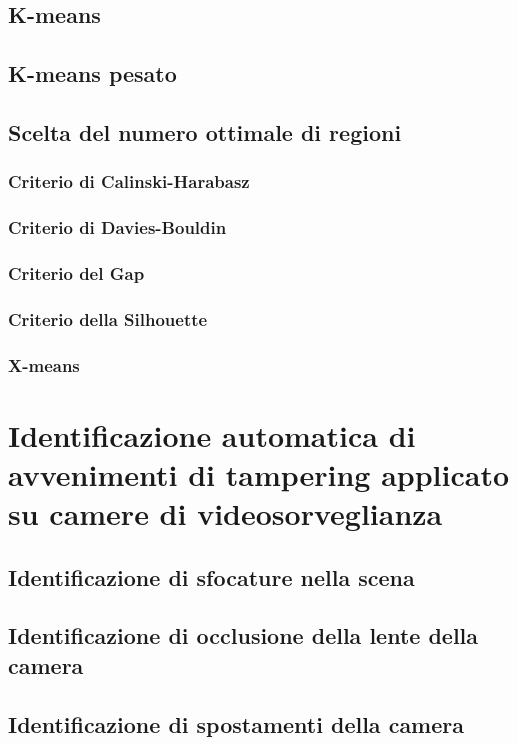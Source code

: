 		\subsection{K-means}
		\subsection{K-means pesato}
		\subsection{Scelta del numero ottimale di regioni}
			\subsubsection{Criterio di Calinski-Harabasz}
			\subsubsection{Criterio di Davies-Bouldin}
			\subsubsection{Criterio del Gap}
			\subsubsection{Criterio della Silhouette}
			\subsubsection{X-means}
	\section{Identificazione automatica di avvenimenti di tampering applicato su camere di videosorveglianza}
		\subsection{Identificazione di sfocature nella scena}
		\subsection{Identificazione di occlusione della lente della camera}
		\subsection{Identificazione di spostamenti della camera}

